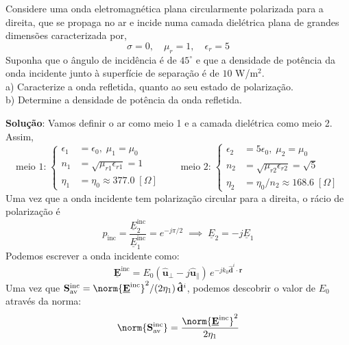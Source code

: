 \clearpage
\begin{question}
    Considere uma onda eletromagnética plana circularmente polarizada para a direita, que se propaga no ar e incide numa camada dielétrica plana de grandes dimensões caracterizada por,
    $$
        \sigma = 0, \quad \mu_r = 1, \quad \epsilon_r = 5
    $$
    Suponha que o ângulo de incidência é de $45^\circ$ e que a densidade de potência da onda incidente junto à superfície de separação é de $10$ W/m$^2$.\\[3pt]
    a) Caracterize a onda refletida, quanto ao seu estado de polarização.\\[3pt]
    b) Determine a densidade de potência da onda refletida.

    \questionSep
    \textbf{Solução}: Vamos definir o ar como meio 1 e a camada dielétrica como meio 2. Assim,
    $$
        \text{meio 1:} \;
        \left\{
        \begin{aligned}
            \epsilon_1 &= \epsilon_0, \; \mu_1 = \mu_0 \\
            n_1 &= \sqrt{\mu_{r1} \epsilon_{r1}} = 1 \\
            \eta_1 &= \eta_0 \approx 377.0\; [\Omega]
        \end{aligned}\right.
        \qquad
        \text{meio 2:} \;
        \left\{
        \begin{aligned}
            \epsilon_2 &= 5\epsilon_0, \; \mu_2 = \mu_0 \\
            n_2 &= \sqrt{\mu_{r2} \epsilon_{r2}} = \sqrt{5} \\
            \eta_2 &= \eta_0/n_2 \approx 168.6\; [\Omega] 
        \end{aligned}\right.
    $$
    Uma vez que a onda incidente tem polarização circular para a direita, o rácio de polarização é
    $$
        p_{\text{inc}} = \frac{\underline{E}^{\text{inc}}_2}{\underline{E}^{\text{inc}}_1} = e^{-j\pi/2}
        \;\implies\;
        \underline{E}_2 = -j\underline{E}_1
    $$
    Podemos escrever a onda incidente como:
    $$
        \mathbf{\underline{E}}^{\text{inc}} = E_0 (\mathbf{\hat{u}}_{\perp} - j\mathbf{\hat{u}}_{\parallel})\, e^{-jk_0 \mathbf{\hat{d}}^i \cdot \mathbf{r}}
    $$
    Uma vez que $\mathbf{S}^{\text{inc}}_{\text{av}} = \norm{\mathbf{\underline{E}}^{\text{inc}}}^2/(2\eta_1)\, \mathbf{\hat{d}}^i$, podemos descobrir o valor de $E_0$ através da norma:
    $$
        \norm{\mathbf{S}^{\text{inc}}_{\text{av}}} = \frac{\norm{\mathbf{\underline{E}}^{\text{inc}}}^2}{2\eta_1}
$$
\end{question}

